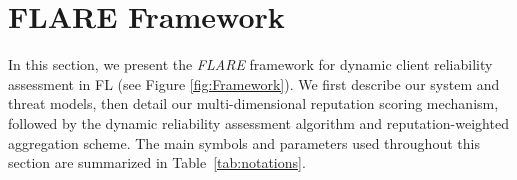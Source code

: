 \documentclass[lettersize,journal]{IEEEtran}
\begin{document}



\section{FLARE Framework}
\label{sec:architecture}
In this section, we present the \textit{FLARE} framework for dynamic client reliability assessment in FL (see Figure \ref{fig:Framework}). We first describe our system and threat models, then detail our multi-dimensional reputation scoring mechanism, followed by the dynamic reliability assessment algorithm and reputation-weighted aggregation scheme.
The main symbols and parameters used throughout this section are summarized in Table~\ref{tab:notations}.
\end{document}
